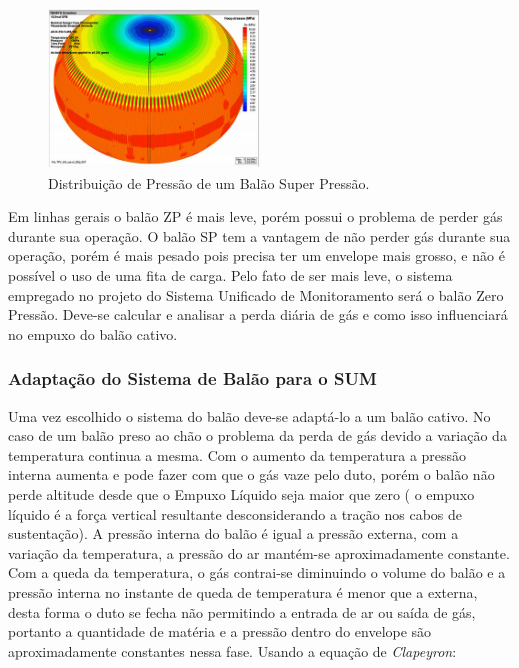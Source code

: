 	\begin{figure}[H]
		\centering
		\includegraphics[width=0.5\textwidth]{figuras/distribuicaoPressao}
		\caption{Distribuição de Pressão de um Balão Super Pressão.}
		\label{img:distribuicaoPressao}
	\end{figure}

	Em linhas gerais o balão ZP é mais leve, porém possui o problema de perder gás durante sua operação. O balão SP tem a vantagem de não perder gás durante sua operação, porém é mais pesado pois precisa ter um envelope mais grosso, e não é possível o uso de uma fita de carga. Pelo fato de ser mais leve, o sistema empregado no projeto do Sistema Unificado de Monitoramento será o balão Zero Pressão. Deve-se calcular e analisar a perda diária de gás e como isso influenciará no empuxo do balão cativo.

	\subsubsection{Adaptação do Sistema de Balão para o SUM}

		Uma vez escolhido o sistema do balão deve-se adaptá-lo a um balão cativo. No caso de um balão preso ao chão o problema da perda de gás devido a variação da temperatura continua a mesma. Com o aumento da temperatura a pressão interna aumenta e pode fazer com que o gás vaze pelo duto, porém o balão não perde altitude desde que o Empuxo Líquido seja maior que zero ( o empuxo líquido é a força vertical resultante desconsiderando a tração nos cabos de sustentação). A pressão interna do balão é igual a pressão externa, com a variação da temperatura, a pressão do ar mantém-se aproximadamente constante.  Com a queda da temperatura, o gás contrai-se diminuindo o volume do balão e a pressão interna no instante de queda de temperatura é menor que a externa, desta forma o duto se fecha não permitindo a entrada de ar ou saída de gás, portanto a quantidade de matéria e a pressão dentro do envelope são aproximadamente constantes nessa fase. Usando a equação de \textit{Clapeyron}:

